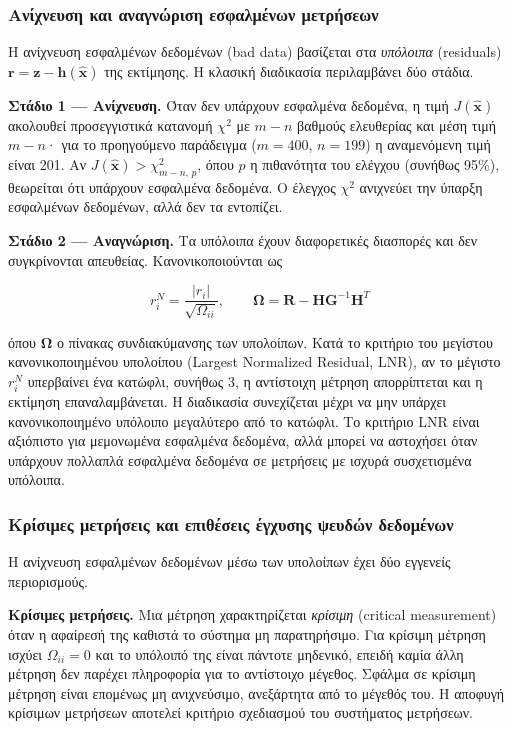 \subsubsection*{Ανίχνευση και αναγνώριση εσφαλμένων μετρήσεων}

Η ανίχνευση εσφαλμένων δεδομένων (bad data) βασίζεται στα \emph{υπόλοιπα} (residuals)
$\mathbf{r} = \mathbf{z}-\mathbf{h}(\hat{\mathbf{x}})$ της εκτίμησης. Η κλασική διαδικασία
περιλαμβάνει δύο στάδια.

\textbf{Στάδιο 1 --- Ανίχνευση.} Όταν δεν υπάρχουν εσφαλμένα δεδομένα, η τιμή
$J(\hat{\mathbf{x}})$ ακολουθεί προσεγγιστικά κατανομή $\chi^2$ με $m-n$ βαθμούς ελευθερίας
και μέση τιμή $m-n$· για το προηγούμενο παράδειγμα ($m = 400$, $n = 199$) η αναμενόμενη τιμή
είναι 201. Αν $J(\hat{\mathbf{x}}) > \chi^2_{m-n,\,p}$, όπου $p$ η πιθανότητα του ελέγχου
(συνήθως 95\%), θεωρείται ότι υπάρχουν εσφαλμένα δεδομένα. Ο έλεγχος $\chi^2$ ανιχνεύει την
ύπαρξη εσφαλμένων δεδομένων, αλλά δεν τα εντοπίζει.

\textbf{Στάδιο 2 --- Αναγνώριση.} Τα υπόλοιπα έχουν διαφορετικές διασπορές και δεν
συγκρίνονται απευθείας. Κανονικοποιούνται ως

\begin{equation}
r_i^{N} = \frac{|r_i|}{\sqrt{\Omega_{ii}}}, \qquad
\boldsymbol{\Omega} = \mathbf{R} - \mathbf{H}\mathbf{G}^{-1}\mathbf{H}^{T}
\label{eq:normres}
\end{equation}

όπου $\boldsymbol{\Omega}$ ο πίνακας συνδιακύμανσης των υπολοίπων. Κατά το κριτήριο του
μεγίστου κανονικοποιημένου υπολοίπου (Largest Normalized Residual, LNR), αν το μέγιστο
$r_i^{N}$ υπερβαίνει ένα κατώφλι, συνήθως 3, η αντίστοιχη μέτρηση απορρίπτεται και η
εκτίμηση επαναλαμβάνεται. Η διαδικασία συνεχίζεται μέχρι να μην υπάρχει κανονικοποιημένο
υπόλοιπο μεγαλύτερο από το κατώφλι. Το κριτήριο LNR είναι αξιόπιστο για μεμονωμένα
εσφαλμένα δεδομένα, αλλά μπορεί να αστοχήσει όταν υπάρχουν πολλαπλά εσφαλμένα δεδομένα σε
μετρήσεις με ισχυρά συσχετισμένα υπόλοιπα.

\subsubsection*{Κρίσιμες μετρήσεις και επιθέσεις έγχυσης ψευδών δεδομένων}

Η ανίχνευση εσφαλμένων δεδομένων μέσω των υπολοίπων έχει δύο εγγενείς περιορισμούς.

\textbf{Κρίσιμες μετρήσεις.} Μια μέτρηση χαρακτηρίζεται \emph{κρίσιμη} (critical measurement)
όταν η αφαίρεσή της καθιστά το σύστημα μη παρατηρήσιμο. Για κρίσιμη μέτρηση ισχύει
$\Omega_{ii} = 0$ και το υπόλοιπό της είναι πάντοτε μηδενικό, επειδή καμία άλλη μέτρηση δεν
παρέχει πληροφορία για το αντίστοιχο μέγεθος. Σφάλμα σε κρίσιμη μέτρηση είναι επομένως μη
ανιχνεύσιμο, ανεξάρτητα από το μέγεθός του. Η αποφυγή κρίσιμων μετρήσεων αποτελεί κριτήριο
σχεδιασμού του συστήματος μετρήσεων.


